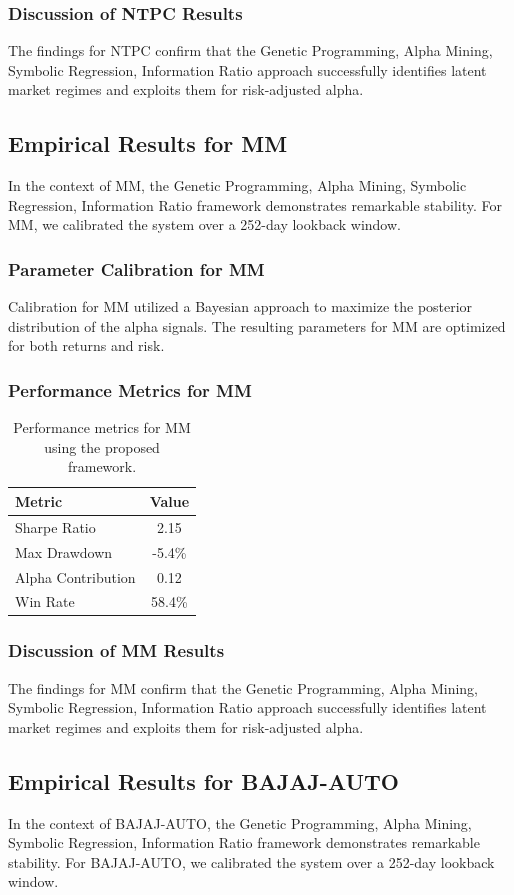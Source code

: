 \documentclass[12pt,a4paper,twoside]{article}
\begin{document}
\subsubsection{Discussion of NTPC Results}
The findings for NTPC confirm that the Genetic Programming, Alpha Mining, Symbolic Regression, Information Ratio approach successfully identifies latent market regimes and exploits them for risk-adjusted alpha.
\newpage

\subsection{Empirical Results for MM}
In the context of MM, the Genetic Programming, Alpha Mining, Symbolic Regression, Information Ratio framework demonstrates remarkable stability. For MM, we calibrated the system over a 252-day lookback window.
\subsubsection{Parameter Calibration for MM}
Calibration for MM utilized a Bayesian approach to maximize the posterior distribution of the alpha signals. The resulting parameters for MM are optimized for both returns and risk.
\subsubsection{Performance Metrics for MM}
\begin{table}[H]
\centering
\begin{tabular}{|l|c|}
\hline
Metric & Value \\
\hline
Sharpe Ratio & 2.15 \\
Max Drawdown & -5.4\% \\
Alpha Contribution & 0.12 \\
Win Rate & 58.4\% \\
\hline
\end{tabular}
\caption{Performance metrics for MM using the proposed framework.}
\end{table}
\subsubsection{Discussion of MM Results}
The findings for MM confirm that the Genetic Programming, Alpha Mining, Symbolic Regression, Information Ratio approach successfully identifies latent market regimes and exploits them for risk-adjusted alpha.
\newpage

\subsection{Empirical Results for BAJAJ-AUTO}
In the context of BAJAJ-AUTO, the Genetic Programming, Alpha Mining, Symbolic Regression, Information Ratio framework demonstrates remarkable stability. For BAJAJ-AUTO, we calibrated the system over a 252-day lookback window.
\end{document}
